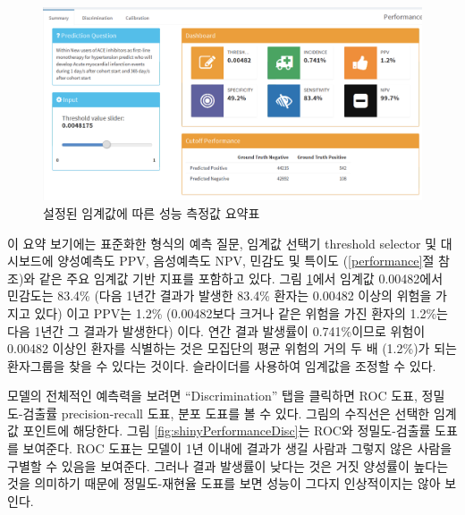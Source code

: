 \documentclass[10.5pt]{book}
\theoremstyle{definition}
\theoremstyle{definition}
\theoremstyle{definition}
\theoremstyle{remark}
\begin{document}
\begin{figure}

{\centering \includegraphics[width=1\linewidth]{images/PatientLevelPrediction/shiny/shinyPerformanceSum} 

}

\caption{설정된 임계값에 따른 성능 측정값 요약표}\label{fig:shinyPerformanceSum}
\end{figure}

이 요약 보기에는 표준화한 형식의 예측 질문, 임계값 선택기 threshold
selector 및 대시보드에 양성예측도 PPV, 음성예측도 NPV, 민감도 및 특이도
(\ref{performance}절 참조)와 같은 주요 임계값 기반 지표를 포함하고 있다.
그림 \ref{fig:shinyPerformanceSum}에서 임계값 0.00482에서 민감도는
83.4\% (다음 1년간 결과가 발생한 83.4\% 환자는 0.00482 이상의 위험을
가지고 있다) 이고 PPV는 1.2\% (0.00482보다 크거나 같은 위험을 가진
환자의 1.2\%는 다음 1년간 그 결과가 발생한다) 이다. 연간 결과 발생률이
0.741\%이므로 위험이 0.00482 이상인 환자를 식별하는 것은 모집단의 평균
위험의 거의 두 배 (1.2\%)가 되는 환자그룹을 찾을 수 있다는 것이다.
슬라이더를 사용하여 임계값을 조정할 수 있다.

모델의 전체적인 예측력을 보려면 ``Discrimination'' 탭을 클릭하면 ROC
도표, 정밀도-검출률 precision-recall 도표, 분포 도표를 볼 수 있다.
그림의 수직선은 선택한 임계값 포인트에 해당한다. 그림
\ref{fig:shinyPerformanceDisc}는 ROC와 정밀도-검출률 도표를 보여준다.
ROC 도표는 모델이 1년 이내에 결과가 생길 사람과 그렇지 않은 사람을
구별할 수 있음을 보여준다. 그러나 결과 발생률이 낮다는 것은 거짓
양성률이 높다는 것을 의미하기 때문에 정밀도-재현율 도표를 보면 성능이
그다지 인상적이지는 않아 보인다.
\end{document}
